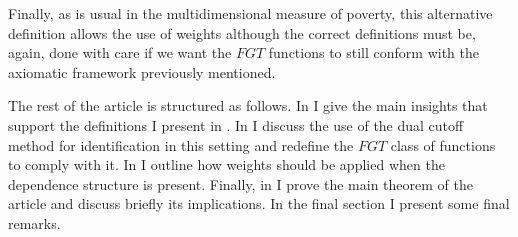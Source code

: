 \documentclass[english, a4paper,12pt]{article}
\begin{document}
Finally, as is usual in the multidimensional measure of poverty, this alternative definition allows the use of weights although the correct definitions must be, again, done with care if we want the $FGT$ functions to still conform with the axiomatic framework previously mentioned.

The rest of the article is structured as follows. In  I give the main insights that support the definitions I present in . In  I discuss the use of the dual cutoff method for identification in this setting and redefine the $FGT$ class of functions to comply with it. In  I outline how weights should be applied when the dependence structure is present. Finally, in  I prove the main theorem of the article and discuss briefly its implications. In the final section I present some final remarks.

\end{document}
